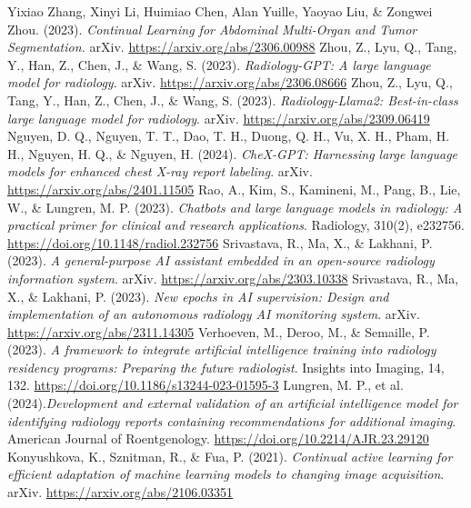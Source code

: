 \documentclass{IEEEcsmag}
\begin{document}
\begin{thebibliography}{31}
    Yixiao Zhang, Xinyi Li, Huimiao Chen, Alan Yuille, Yaoyao Liu, \& Zongwei Zhou. (2023).
    \textit{Continual Learning for Abdominal Multi-Organ and Tumor Segmentation.}
    arXiv. \url{https://arxiv.org/abs/2306.00988}
        Zhou, Z., Lyu, Q., Tang, Y., Han, Z., Chen, J., \& Wang, S. (2023). \textit{Radiology-GPT: A large language model for radiology}. arXiv. \url{https://arxiv.org/abs/2306.08666}
        Zhou, Z., Lyu, Q., Tang, Y., Han, Z., Chen, J., \& Wang, S. (2023). \textit{Radiology-Llama2: Best-in-class large language model for radiology}. arXiv. \url{https://arxiv.org/abs/2309.06419}
        Nguyen, D. Q., Nguyen, T. T., Dao, T. H., Duong, Q. H., Vu, X. H., Pham, H. H., Nguyen, H. Q., \& Nguyen, H. (2024). \textit{CheX-GPT: Harnessing large language models for enhanced chest X-ray report labeling}. arXiv. \url{https://arxiv.org/abs/2401.11505}
        Rao, A., Kim, S., Kamineni, M., Pang, B., Lie, W., \& Lungren, M. P. (2023). \textit{Chatbots and large language models in radiology: A practical primer for clinical and research applications}. Radiology, 310(2), e232756. \url{https://doi.org/10.1148/radiol.232756}
        Srivastava, R., Ma, X., \& Lakhani, P. (2023).\textit{ A general-purpose AI assistant embedded in an open-source radiology information system}. arXiv. \url{https://arxiv.org/abs/2303.10338}
        Srivastava, R., Ma, X., \& Lakhani, P. (2023). \textit{New epochs in AI supervision: Design and implementation of an autonomous radiology AI monitoring system}. arXiv. \url{https://arxiv.org/abs/2311.14305}
        Verhoeven, M., Deroo, M., \& Semaille, P. (2023). \textit{A framework to integrate artificial intelligence training into radiology residency programs: Preparing the future radiologist}. Insights into Imaging, 14, 132. \url{https://doi.org/10.1186/s13244-023-01595-3}
        Lungren, M. P., et al. (2024).\textit{Development and external validation of an artificial intelligence model for identifying radiology reports containing recommendations for additional imaging}. American Journal of Roentgenology. \url{https://doi.org/10.2214/AJR.23.29120}
        Konyushkova, K., Sznitman, R., \& Fua, P. (2021). \textit{Continual active learning for efficient adaptation of machine learning models to changing image acquisition}. arXiv. \url{https://arxiv.org/abs/2106.03351}

\end{thebibliography}
\end{document}

